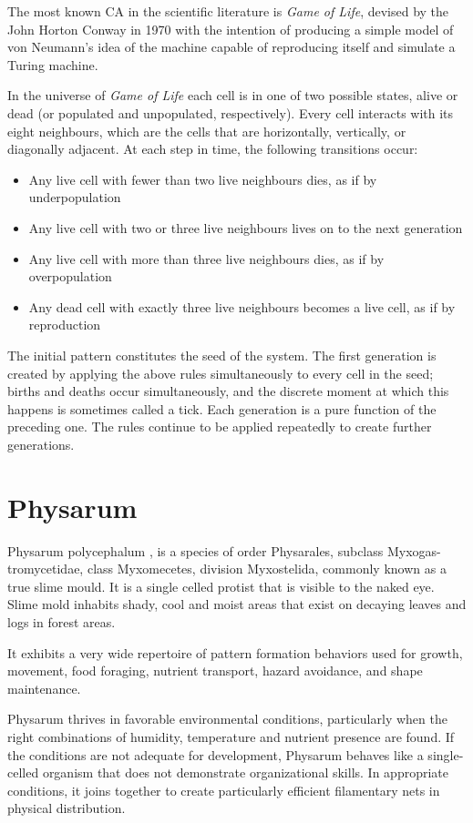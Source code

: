 \par
The most known CA in the scientific literature is \textit{Game of Life}, devised by the John Horton Conway in 1970 with the intention of producing a simple model of von Neumann's idea of the machine capable of reproducing itself and simulate a Turing machine. 
\par
In the universe of \textit{Game of Life} each cell is in one of two possible states, alive or dead (or populated and unpopulated, respectively). Every cell interacts with its eight neighbours, which are the cells that are horizontally, vertically, or diagonally adjacent. At each step in time, the following transitions occur:
\begin{itemize}
	\item Any live cell with fewer than two live neighbours dies, as if by underpopulation
	\item Any live cell with two or three live neighbours lives on to the next generation
	\item Any live cell with more than three live neighbours dies, as if by overpopulation
	\item Any dead cell with exactly three live neighbours becomes a live cell, as if by reproduction
\end{itemize}
\par
The initial pattern constitutes the seed of the system. The first generation is created by applying the above rules simultaneously to every cell in the seed; births and deaths occur simultaneously, and the discrete moment at which this happens is sometimes called a tick. Each generation is a pure function of the preceding one. The rules continue to be applied repeatedly to create further generations. 

\section{Physarum}
Physarum polycephalum \cite{sun2017physarum}, \cite{mayne2016biology} is a species of order Physarales, subclass Myxogas-tromycetidae, class Myxomecetes, division Myxostelida, commonly known as a true slime mould.
It is a single celled protist that is visible to the naked eye. Slime mold inhabits shady, cool and moist areas that exist on decaying leaves and logs in forest areas.
\par
It exhibits a very wide repertoire of pattern formation behaviors used for growth, movement, food foraging, nutrient transport, hazard avoidance, and shape maintenance. 
\par
Physarum thrives in favorable environmental conditions, particularly when the right combinations of humidity, temperature and nutrient presence are found. If the conditions are not adequate for development, Physarum behaves like a single-celled organism that does not demonstrate organizational skills. In appropriate conditions, it joins together to create particularly efficient filamentary nets in physical distribution.

